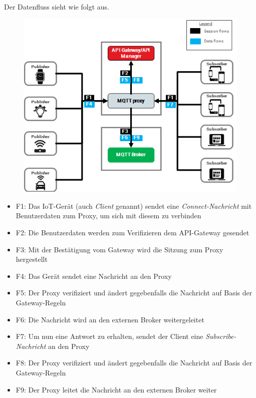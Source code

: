         Der Datenfluss sieht wie folgt aus.
        \begin{figure}[h]%
            \centering
            \includegraphics[width=14cm]{tex/bilder/2_grundlagen/axway-mqtt-proxy02_short.png}
            \label{fig:axway-proxy}
        \end{figure}
        \begin{itemize}
            \item F1: Das \ac{IoT}-Gerät (auch \emph{Client} genannt) sendet eine \emph{Connect-Nachricht} mit Benutzerdaten zum Proxy, um sich mit diesem zu verbinden
            \item F2: Die Benutzerdaten werden zum Verifizieren dem API-Gateway gesendet
            \item F3: Mit der Bestätigung vom Gateway wird die Sitzung zum Proxy hergestellt
            \item F4: Das Gerät sendet eine Nachricht an den Proxy
            \item F5: Der Proxy verifiziert und ändert gegebenfalls die Nachricht auf Basis der Gateway-Regeln
            \item F6: Die Nachricht wird an den externen Broker weitergeleitet
            \item F7: Um nun eine Antwort zu erhalten, sendet der Client eine \emph{Subscribe-Nachricht} an den Proxy
            \item F8: Der Proxy verifiziert und ändert gegebenfalls die Nachricht auf Basis der Gateway-Regeln
            \item F9: Der Proxy leitet die Nachricht an den externen Broker weiter
        \end{itemize}
